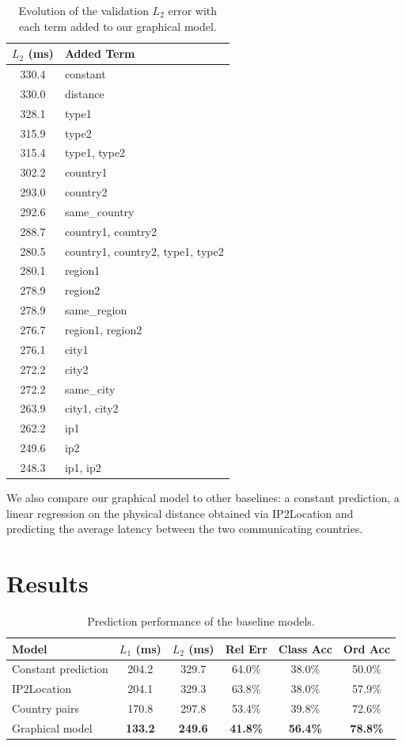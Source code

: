 \documentclass[10pt,a4paper,notitlepage,twocolumn]{article}
\begin{document}
\begin{table}
\centering
\begin{tabular}{|cl|}
\hline $L_2$ (ms) & Added Term \\ \hline\hline
330.4 & constant \\
330.0 & distance \\
328.1 & type1 \\
315.9 & type2 \\
315.4 & type1, type2 \\
302.2 & country1 \\
293.0 & country2 \\
292.6 & same\_country \\
288.7 & country1, country2 \\
280.5 & country1, country2, type1, type2 \\
280.1 & region1 \\
278.9 & region2 \\
278.9 & same\_region \\
276.7 & region1, region2 \\
276.1 & city1 \\
272.2 & city2 \\
272.2 & same\_city \\
263.9 & city1, city2 \\
262.2 & ip1 \\
249.6 & ip2 \\
248.3 & ip1, ip2 \\
\hline 
\end{tabular} 
\caption{Evolution of the validation $L_2$ error with each term added to our graphical model.}
\label{tab:terms}
\end{table}


We also compare our graphical model to other baselines: a constant prediction, a linear regression on the physical distance obtained via IP2Location and predicting the average latency between the two communicating countries.


\section{Results}


\begin{table}[!ht]
\centering
\begin{tabular}{|l|c|c|c|c|c|}
\hline Model & $L_1$ (ms)  & $L_2$ (ms) & Rel Err & Class Acc & Ord Acc \\ \hline\hline
Constant prediction & 204.2 & 329.7 & 64.0\% & 38.0\% & 50.0\% \\
IP2Location & 204.1 & 329.3 & 63.8\% & 38.0\% & 57.9\% \\
Country pairs & 170.8 & 297.8 & 53.4\% & 39.8\% & 72.6\% \\ 
Graphical model & \bf 133.2 & \bf 249.6 & \bf 41.8\% & \bf 56.4\% & \bf 78.8\% \\ \hline 
\end{tabular} 
\caption{Prediction performance of the baseline models.}
\label{tab:comp}
\end{table}
\end{document}
